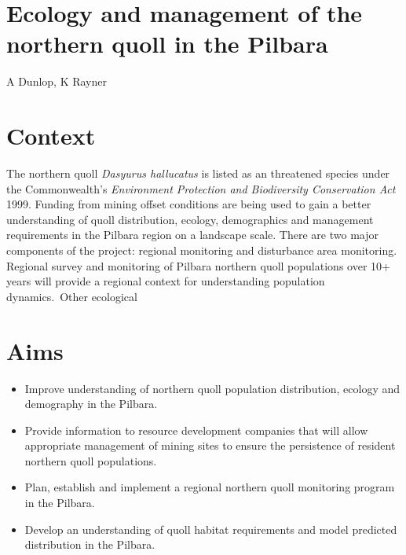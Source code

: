 \documentclass[version=last,
    paper=a4, %
    10pt, %
    usenames,
    dvipsnames,
    oneside, %
    headings=openany, %
    DIV=15 %
]{scrbook}
\begin{document}
\section*{Ecology and management of the northern quoll in the Pilbara
}

A Dunlop, K Rayner


\section*{Context}
The northern quoll \emph{Dasyurus hallucatus} is listed as an threatened
species under the Commonwealth's \emph{Environment Protection and
Biodiversity Conservation Act} 1999. Funding from mining offset
conditions are being used to gain a better understanding of quoll
distribution, ecology, demographics and management requirements in the
Pilbara region on a landscape scale. There are two major components of
the project: regional monitoring and disturbance area monitoring.
Regional survey and monitoring of Pilbara northern quoll populations
over 10+ years will provide a regional context for understanding
population dynamics.~Other ecological~



\section*{Aims}
\begin{itemize}
\itemsep1pt\parskip0pt
\item
  Improve understanding of northern quoll population distribution,
  ecology and demography in the Pilbara.
\item
  Provide information to resource development companies that will allow
  appropriate management of mining sites to ensure the persistence of
  resident northern quoll populations.
\item
  Plan, establish and implement a regional northern quoll monitoring
  program in the Pilbara.
\item
  Develop an understanding of quoll habitat requirements and model
  predicted distribution in the Pilbara.
\end{itemize}
\end{document}
